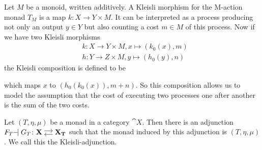 \begin{example}
    Let $M$ be a monoid, written additively. A Kleisli morphism for the M-action monad $T_M$
    is a map $k \colon X \to Y \times M$. It can be interpreted as a process producing not only 
    an output $y \in Y$ but also counting a cost $m \in M$ of this process.
    Now if we have two Kleisli morphisms 
    \begin{align*}
        &k \colon X \to Y \times M, x \mapsto (k_0(x),m) \\
        &h \colon Y \to Z \times M, y \mapsto (h_0(y),n)
    \end{align*}
    the Kleisli composition is defined to be
    which maps $x$ to $(h_0(k_0(x)),m+n)$. So this composition allows us to model the assumption
    that the cost of executing two processes one after another is the sum of the two costs.
\end{example}
\begin{theorem}
    Let $(T,\eta,\mu)$ be a monad in a category $\cat{X}$.
    Then there is an adjunction $F_T \! \! \adj G_T \colon \adjar{X}{X_T}$
    such that the monad induced by this adjunction is $(T,\eta,\mu)$.
    We call this the Kleisli-adjunction.
\end{theorem}
